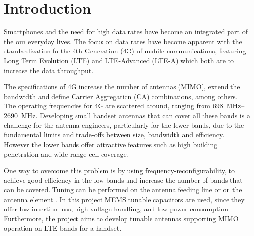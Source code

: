 \chapter{Introduction}
\label{cha:intro}
Smartphones and the need for high data rates have become an integrated part of the our everyday lives. The focus on data rates have become apparent with the standardization fo the 4th Generation (4G) of mobile communications, featuring Long Term Evolution (LTE) and LTE-Advanced (LTE-A) which both are to increase the data throughput. 

The specifications of 4G increase the number of antennas (MIMO), extend the bandwidth and define Carrier Aggregation (CA) combinations, among others. The operating frequencies for 4G are scattered around, ranging from \SIrange{698}{2690}{MHz}. Developing small handset antennas that can cover all these bands is a challenge for the antenna engineers, particularly for the lower bands, due to the fundamental limits and trade-offs between size, bandwidth and efficiency\cite{}. However the lower bands offer attractive features such as high building penetration and wide range cell-coverage. 

One way to overcome this problem is by using frequency-reconfigurability, to achieve good efficiency in the low bands and increase the number of bands that can be covered. Tuning can be performed on the antenna feeding line \cite{} \cite{} or on the antenna element \cite{} \cite{}. In this project MEMS tunable capacitors are used, since they offer low insertion loss, high voltage handling, and low power consumption\cite{}. Furthermore, the project aims to develop tunable antennas supporting MIMO operation on LTE bands for a handset. 

